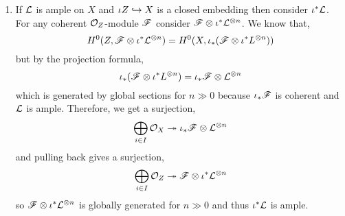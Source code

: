 \documentclass[12pt]{article}
\begin{document}
\begin{enumerate}
\item If $\mathcal{L}$ is ample on $X$ and $\iota Z \hookrightarrow X$ is a closed embedding then consider $\iota^* \mathcal{L}$. For any coherent $\mathcal{O}_{Z}$-module $\mathscr{F}$ consider $\mathscr{F} \otimes \iota^* \mathcal{L}^{\otimes n}$. We know that,
\[ H^0(Z, \mathscr{F} \otimes \iota^* \mathcal{L}^{\otimes n}) = H^0(X, \iota_* (\mathscr{F} \otimes \iota^* L^{\otimes n})) \]
but by the projection formula,
\[ \iota_* (\mathscr{F} \otimes \iota^* L^{\otimes n}) = \iota_* \mathscr{F} \otimes \mathcal{L}^{\otimes n} \]
which is generated by global sections for $n \gg 0$ because $\iota_* \mathscr{F}$ is coherent and $\mathcal{L}$ is ample. Therefore, we get a surjection,
\[ \bigoplus_{i \in I} \mathcal{O}_{X} \twoheadrightarrow \iota_* \mathscr{F} \otimes \mathcal{L}^{\otimes n} \]
and pulling back gives a surjection,
\[ \bigoplus_{i \in I} \mathcal{O}_{Z} \twoheadrightarrow \mathscr{F} \otimes \iota^* \mathcal{L}^{\otimes n} \]
so $\mathscr{F} \otimes \iota^* \mathcal{L}^{\otimes n}$ is globally generated for $n \gg 0$ and thus $\iota^* \mathcal{L}$ is ample.


\end{enumerate}
\end{document}
